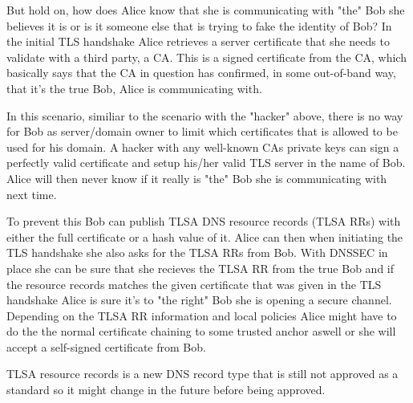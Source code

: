 But hold on, how does Alice know that she is communicating with "the" Bob she believes it is or is it someone else that is trying to fake the identity of Bob?
In the initial TLS handshake Alice retrieves a server certificate that she needs to validate with a third party, a CA.
This is a signed certificate from the CA, which basically says that the CA in question has confirmed, in some out-of-band way, that it's the true Bob, Alice is communicating with.

In this scenario, similiar to the scenario with the "hacker" above, there is no way for Bob as server/domain owner to limit which certificates that is allowed to be used for his domain.
A hacker with any well-known CAs private keys can sign a perfectly valid certificate and setup his/her valid TLS server in the name of Bob.
Alice will then never know if it really is "the" Bob she is communicating with next time.

To prevent this Bob can publish TLSA DNS resource records (TLSA RRs)\cite[ch. 2]{rfc:draft-dane} with either the full certificate or a hash value of it.
Alice can then when initiating the TLS handshake she also asks for the TLSA RRs from Bob.
With DNSSEC in place she can be sure that she recieves the TLSA RR from the true Bob and if the resource records matches the given certificate that was given in the TLS handshake Alice is sure it's to "the right" Bob she is opening a secure channel.
Depending on the TLSA RR information and local policies Alice might have to do the the normal certificate chaining to some trusted anchor aswell or she will accept a self-signed certificate from Bob.


TLSA resource records is a new DNS record type that is still not approved as a standard so it might change in the future before being approved.

